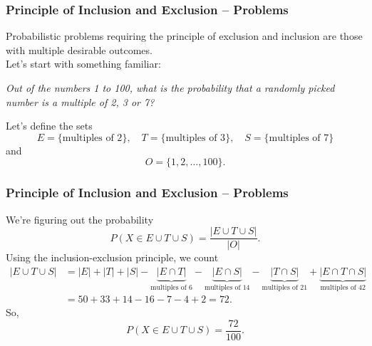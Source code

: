 \documentclass[aspectratio=169,11pt,usenames,dvipsnames]{beamer}
\begin{document}
\begin{frame}
 \frametitle{Principle of Inclusion and Exclusion -- Problems}
 Probabilistic problems requiring the \alert{principle of exclusion and
 inclusion} are those with multiple desirable outcomes.\pause\\
 Let's start with something familiar:
 \begin{center}
  \emph{Out of the numbers 1 to 100, what is the probability that a randomly
  picked number is a multiple of 2, 3 or 7?}
 \end{center}
 \pause
 Let's define the sets
 \[
  E = \{\text{multiples of 2}\}, \quad T = \{\text{multiples of 3}\}, \quad S =
  \{\text{multiples of 7}\}
 \]
 \pause
 and
 \[
  O = \{1,2,\ldots,100\}.
 \]
\end{frame}

\begin{frame}
 \frametitle{Principle of Inclusion and Exclusion -- Problems}
 We're figuring out the probability
 \[
  P(X \in E \cup T \cup S) = \frac{|E \cup T \cup S|}{|O|}.
 \]
 \pause
 Using the \alert{inclusion-exclusion principle}, we count
 \begin{align*}
  |E \cup T \cup S| &= |E| + |T| + |S| - \underbrace{|E \cap
  T|}_{\text{multiples of $6$}} - \underbrace{|E \cap S|}_{\text{multiples of
  $14$}} - \underbrace{|T \cap S|}_{\text{multiples of $21$}} + \underbrace{|E \cap T \cap
  S|}_{\text{multiples of $42$}} \\
                    &= 50 + 33 + 14 - 16 - 7 - 4 + 2 = 72.
 \end{align*}
 \pause
 So,
 \[
  P(X \in E \cup T \cup S) = \frac{72}{100}.
 \]
 
\end{frame}
\end{document}
